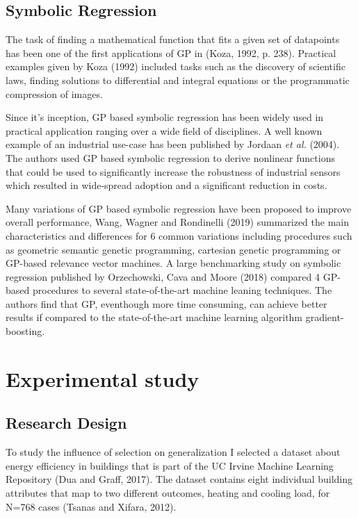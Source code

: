 \documentclass[
  12pt,
]{article}
\begin{document}
\hypertarget{symbolic-regression}{%
\subsection{Symbolic Regression}\label{symbolic-regression}}

The task of finding a mathematical function that fits a given set of
datapoints has been one of the first applications of GP in (Koza, 1992,
p. 238). Practical examples given by Koza (1992) included tasks such as
the discovery of scientific laws, finding solutions to differential and
integral equations or the programmatic compression of images.

Since it's inception, GP based symbolic regression has been widely used
in practical application ranging over a wide field of disciplines. A
well known example of an industrial use-case has been published by
Jordaan \emph{et al.} (2004). The authors used GP based symbolic
regression to derive nonlinear functions that could be used to
significantly increase the robustness of industrial sensors which
resulted in wide-spread adoption and a significant reduction in costs.

Many variations of GP based symbolic regression have been proposed to
improve overall performance, Wang, Wagner and Rondinelli (2019)
summarized the main characteristics and differences for 6 common
variations including procedures such as geometric semantic genetic
programming, cartesian genetic programming or GP-based relevance vector
machines. A large benchmarking study on symbolic regression published by
Orzechowski, Cava and Moore (2018) compared 4 GP-based procedures to
several state-of-the-art machine leaning techniques. The authors find
that GP, eventhough more time consuming, can achieve better results if
compared to the state-of-the-art machine learning algorithm
gradient-boosting.

\hypertarget{experimental-study}{%
\section{Experimental study}\label{experimental-study}}

\hypertarget{research-design}{%
\subsection{Research Design}\label{research-design}}

To study the influence of selection on generalization I selected a
dataset about energy efficiency in buildings that is part of the UC
Irvine Machine Learning Repository (Dua and Graff, 2017). The dataset
contains eight individual building attributes that map to two different
outcomes, heating and cooling load, for N=768 cases (Tsanas and Xifara,
2012).
\end{document}
